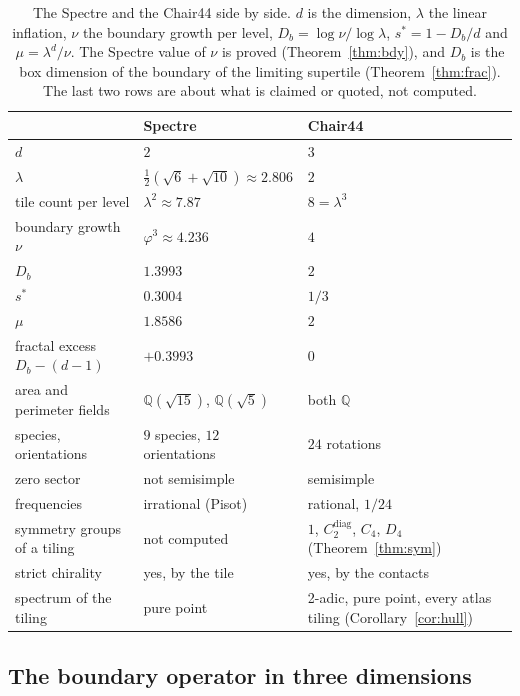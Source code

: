 \documentclass[11pt]{article}
\theoremstyle{definition}
\theoremstyle{remark}
\newcommand{\lam}{\lambda}
\begin{document}
\begin{footnotesize}
\begin{table}[h]
\centering
\footnotesize
\caption{The Spectre and the Chair44 side by side.  $d$ is the dimension, $\lam$ the linear
inflation, $\nu$ the boundary growth per level, $D_b=\log\nu/\log\lam$,
$s^{*}=1-D_b/d$ and $\mu=\lam^{d}/\nu$.  The Spectre value of $\nu$ is proved
(Theorem~\ref{thm:bdy}), and $D_b$ is the box dimension of the boundary of the limiting supertile
(Theorem~\ref{thm:frac}).  The
last two rows are about what is claimed or quoted, not computed.}
\label{tab:chair}
\begin{tabular}{lll}
\toprule
 & Spectre & Chair44 \\
\midrule
$d$ & $2$ & $3$ \\
$\lam$ & $\tfrac12(\sqrt6+\sqrt{10})\approx2.806$ & $2$ \\
tile count per level & $\lam^{2}\approx7.87$ & $8=\lam^{3}$ \\
boundary growth $\nu$ & $\varphi^{3}\approx4.236$ & $4$ \\
$D_b$ & $1.3993$ & $2$ \\
$s^{*}$ & $0.3004$ & $1/3$ \\
$\mu$ & $1.8586$ & $2$ \\
fractal excess $D_b-(d-1)$ & $+0.3993$ & $0$ \\
area and perimeter fields & $\mathbb{Q}(\sqrt{15})$, $\mathbb{Q}(\sqrt5)$ & both $\mathbb{Q}$ \\
species, orientations & $9$ species, $12$ orientations & $24$ rotations \\
zero sector & not semisimple & semisimple \\
frequencies & irrational (Pisot) & rational, $1/24$ \\
symmetry groups of a tiling & not computed & $1$, $C_{2}^{\mathrm{diag}}$, $C_{4}$, $D_{4}$ (Theorem~\ref{thm:sym}) \\
strict chirality & yes, by the tile & yes, by the contacts \\
spectrum of the tiling & pure point~\cite{BaakeSpectre} & 2-adic, pure point, every atlas tiling (Corollary~\ref{cor:hull}) \\
\bottomrule
\end{tabular}
\end{table}
\end{footnotesize}

\subsection{The boundary operator in three dimensions}
\end{document}
